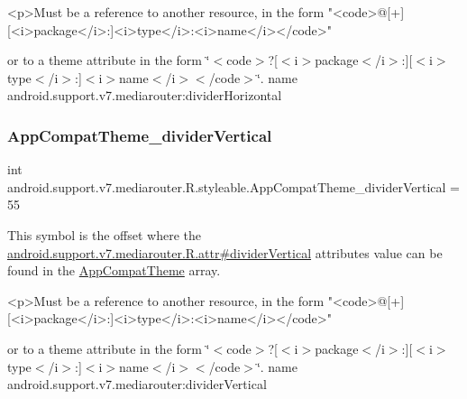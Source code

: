 \begin{DoxyVerb}      <p>Must be a reference to another resource, in the form "<code>@[+][<i>package</i>:]<i>type</i>:<i>name</i></code>"
\end{DoxyVerb}
 or to a theme attribute in the form \char`\"{}$<$code$>$?\mbox{[}$<$i$>$package$<$/i$>$\+:\mbox{]}\mbox{[}$<$i$>$type$<$/i$>$\+:\mbox{]}$<$i$>$name$<$/i$>$$<$/code$>$\char`\"{}.  name android.\+support.\+v7.\+mediarouter\+:divider\+Horizontal \mbox{\label{classandroid_1_1support_1_1v7_1_1mediarouter_1_1R_1_1styleable_af04d015bffeaa6e33a461f5976092ee7}} 
\subsubsection{\texorpdfstring{App\+Compat\+Theme\+\_\+divider\+Vertical}{AppCompatTheme\_dividerVertical}}
{\footnotesize\ttfamily int android.\+support.\+v7.\+mediarouter.\+R.\+styleable.\+App\+Compat\+Theme\+\_\+divider\+Vertical = 55\hspace{0.3cm}{\ttfamily [static]}}

This symbol is the offset where the \hyperlink{classandroid_1_1support_1_1v7_1_1mediarouter_1_1R_1_1attr_a682a495d66b60b4085b3e2eb570f2f79}{android.\+support.\+v7.\+mediarouter.\+R.\+attr\#divider\+Vertical} attribute\textquotesingle{}s value can be found in the \hyperlink{classandroid_1_1support_1_1v7_1_1mediarouter_1_1R_1_1styleable_a4e3d3900c75d49aeb2f283cac00214d6}{App\+Compat\+Theme} array.

\begin{DoxyVerb}      <p>Must be a reference to another resource, in the form "<code>@[+][<i>package</i>:]<i>type</i>:<i>name</i></code>"
\end{DoxyVerb}
 or to a theme attribute in the form \char`\"{}$<$code$>$?\mbox{[}$<$i$>$package$<$/i$>$\+:\mbox{]}\mbox{[}$<$i$>$type$<$/i$>$\+:\mbox{]}$<$i$>$name$<$/i$>$$<$/code$>$\char`\"{}.  name android.\+support.\+v7.\+mediarouter\+:divider\+Vertical \mbox{\label{classandroid_1_1support_1_1v7_1_1mediarouter_1_1R_1_1styleable_a3a6ed7fa586db357c9b5385ac2be0ddf}} 
